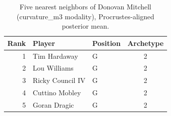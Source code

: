 \begin{table}[htbp]
  \centering\small
  \begin{tabular}{rllc}
    \toprule
    Rank & Player & Position & Archetype \\
    \midrule
    1 & Tim Hardaway & G & 2 \\
    2 & Lou Williams & G & 2 \\
    3 & Ricky Council IV & G & 2 \\
    4 & Cuttino Mobley & G & 2 \\
    5 & Goran Dragic & G & 2 \\
    \bottomrule
  \end{tabular}
  \caption{Five nearest neighbors of Donovan Mitchell (curvature_m3 modality), Procrustes-aligned posterior mean.}
  \label{tab:Donovan_Mitchell_neighbors_curvature_m3}
\end{table}

